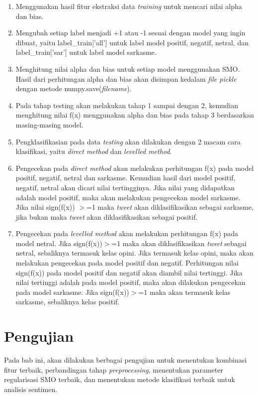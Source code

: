\begin{enumerate}[leftmargin=*]
	\item Menggunakan hasil fitur ekstraksi data \textit{training} untuk mencari nilai alpha dan bias.\item Mengubah setiap label menjadi +1 atau -1 sesuai dengan model yang ingin dibuat, yaitu label\_train$[$'all'$]$ untuk label model positif, 	negatif, netral, dan label\_train$[$'sar'$]$ untuk label model sarkasme.
	\item Menghitung nilai alpha dan bias untuk setiap model menggunakan 
	SMO. Hasil dari perhitungan alpha dan bias akan disimpan kedalam \textit{file pickle} dengan metode numpy.save(\textit{filename}).
	\item Pada tahap testing akan melakukan tahap 1 sampai dengan 2, kemudian menghitung nilai f(x) menggunakan alpha dan bias pada tahap 3 berdasarkan masing-masing model.
	\item Pengklasifikasian pada data \textit{testing} akan dilakukan dengan 2 macam cara klasifikasi, yaitu \textit{direct method }dan \textit{levelled method}.
	\item Pengecekan pada \textit{direct method }akan melakukan perhitungan f(x) pada model positif, negatif, netral dan sarkasme. Kemudian hasil dari model positif, negatif, netral akan dicari nilai tertingginya. Jika nilai yang didapatkan adalah model positif, maka akan melakukan pengecekan model sarkasme. Jika nilai sign(f(x)) $>$=1 maka \textit{tweet} akan diklasifikasikan sebagai sarkasme, jika bukan maka 
	\textit{tweet} akan diklasifikasikan sebagai positif.
	\item Pengecekan pada \textit{levelled method }akan melakukan perhitungan f(x) pada model netral. Jika sign(f(x))$>$=1 maka akan diklasifikasikan \textit{tweet} sebagai netral, sebaliknya termasuk kelas opini. Jika termasuk kelas opini, maka akan melakukan pengecekan pada model positif dan negatif. Perhitungan nilai sign(f(x)) pada model positif dan negatif akan diambil nilai tertinggi. Jika nilai tertinggi adalah pada model positif, maka akan dilakukan pengecekan pada model 
	sarkasme. Jika sign(f(x))$>$=1 maka akan termasuk kelas sarkasme, sebaliknya kelas positif.
\end{enumerate}
\section{Pengujian}
Pada bab ini, akan dilakukan berbagai pengujian untuk menentukan kombinasi fitur terbaik, perbandingan tahap \textit{preprocessing}, menentukan parameter regularisasi SMO terbaik, dan menentukan metode klasifikasi terbaik untuk analisis sentimen.
